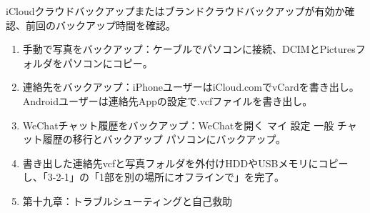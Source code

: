 \begin{tcbpractice}{iCloudクラウドバックアップまたはブランドクラウドバックアップが有効か確認、前回のバックアップ時間を確認。}
\begin{enumerate}
  \item 手動で写真をバックアップ：ケーブルでパソコンに接続、DCIMとPicturesフォルダをパソコンにコピー。
  \item 連絡先をバックアップ：iPhoneユーザーはiCloud.comでvCardを書き出し。Androidユーザーは連絡先Appの設定で.vcfファイルを書き出し。
  \item WeChatチャット履歴をバックアップ：WeChatを開く マイ 設定 一般 チャット履歴の移行とバックアップ パソコンにバックアップ。
  \item 書き出した連絡先vcfと写真フォルダを外付けHDDやUSBメモリにコピーし、「3-2-1」の「1部を別の場所にオフラインで」を完了。
  \item 第十九章：トラブルシューティングと自己救助
\end{enumerate}

\end{tcbpractice}
